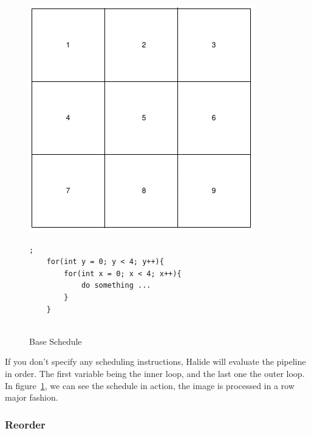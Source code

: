 \begin{figure}[h]
		\begin{minipage}[c]{\EIW}
			\centering
		\includegraphics[width=\textwidth]{Images/BaseOrder.png}
		\end{minipage}
		\begin{minipage}[c]{\ECW}
			\centering
			\begin{lstlisting}[label={code:reorder}];
	for(int y = 0; y < 4; y++){
		for(int x = 0; x < 4; x++){
			do something ...
		}
	}
	
\end{lstlisting}
		\end{minipage}
	\caption{Base Schedule}
	\label{schedule:default}
\end{figure}



	If you don't specify any scheduling instructions, Halide will evaluate the pipeline in order. The first variable being the inner loop, and the last one the outer loop. In figure~\ref{schedule:default}, we can see the schedule in action, the image is processed in a row major fashion.

	\subsubsection{Reorder}


